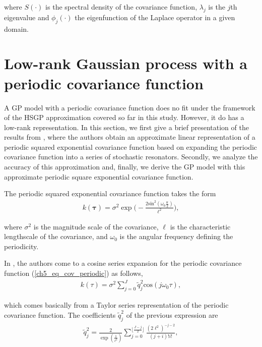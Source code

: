 \documentclass[onecolumn,a4paper,11pt]{article}
\begin{document}
\noindent where $S(\cdot)$ is the spectral density of the covariance function, $\lambda_j$ is the $j$th eigenvalue and $\phi_j(\cdot)$ the eigenfunction of the Laplace operator in a given domain.



\section{Low-rank Gaussian process with a periodic covariance function}\label{ch5_sec_periodic}

A GP model with a periodic covariance function does no fit under the framework of the HSGP approximation covered so far in this study. However, it do has a low-rank representation. In this section, we first give a brief presentation of the results from \cite{solin2014explicit}, where the authors obtain an approximate linear representation of a periodic squared exponential covariance function based on expanding the periodic covariance function into a series of stochastic resonators. Secondly, we analyze the accuracy of this approximation and, finally, we derive the GP model with this approximate periodic square exponential covariance function.

The periodic squared exponential covariance function takes the form
%
\begin{eqnarray} \label{ch5_eq_cov_periodic}
k(\bm{\tau})= \sigma^2 \exp\Big(-\frac{2\text{sin}^2\left(\omega_0\frac{\bm{\tau}}{2}\right)}{\ell^2}\Big),
\end{eqnarray}

\noindent where $\sigma^2$ is the magnitude scale of the covariance, $\ell$ is the characteristic lengthscale of the covariance, and $\omega_0$ is the angular frequency defining the periodicity. 

In \cite{solin2014explicit}, the authors come to a cosine series expansion for the periodic covariance function (\ref{ch5_eq_cov_periodic}) as follows,
% 
\begin{eqnarray} \label{ch5_eq_cov_periodic_taylor_approx}
k(\tau)= \sigma^2 \sum_{j=0}^{J} \tilde{q}_j^2 \text{cos}(j\omega_0 \tau),
\end{eqnarray}

\noindent which comes basically from a Taylor series representation of the periodic covariance function. The coefficients $\tilde{q}_j^2$ of the previous expression are
%
\begin{eqnarray} \label{ch5_eq_q}
\tilde{q}_j^2= \frac{2}{\exp\left(\frac{1}{\ell^2}\right)} \sum_{j=0}^{\lfloor \frac{J-j}{2} \rfloor} \frac{(2\ell^2)^{-j-2}}{(j+i)!i!},
\end{eqnarray}
\end{document}
